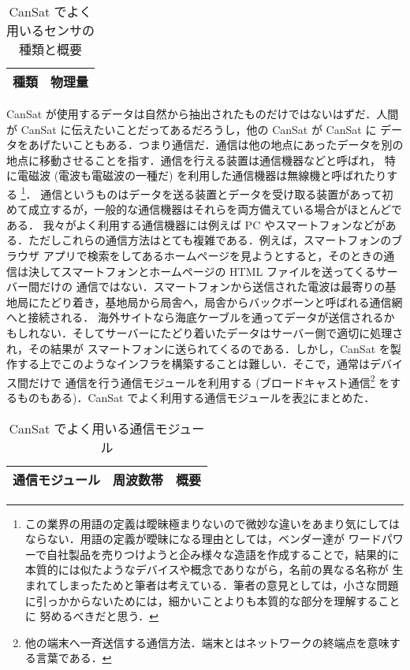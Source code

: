 \documentclass[dvipdfmx]{jsbook}
\begin{document}
  \begin{table}[htbp]
    \centering
    \caption{CanSat でよく用いるセンサの種類と概要}
    \begin{tabular}{c|r} \hline
      種類 & 物理量 \\ \hline
    \end{tabular}
    \label{tab:2.2.2-sensors}
  \end{table}

  CanSat が使用するデータは自然から抽出されたものだけではないはずだ．人間が CanSat に伝えたいことだってあるだろうし，他の CanSat が CanSat に
  データをあげたいこともある．つまり通信だ．通信は他の地点にあったデータを別の地点に移動させることを指す．通信を行える装置は通信機器などと呼ばれ，
  特に電磁波 (電波も電磁波の一種だ) を利用した通信機器は無線機と呼ばれたりする
  \footnote{この業界の用語の定義は曖昧極まりないので微妙な違いをあまり気にしてはならない．用語の定義が曖昧になる理由としては，ベンダー達が
  ワードパワーで自社製品を売りつけようと企み様々な造語を作成することで，結果的に本質的には似たようなデバイスや概念でありながら，名前の異なる名称が
  生まれてしまったためと筆者は考えている．筆者の意見としては，小さな問題に引っかからないためには，細かいことよりも本質的な部分を理解することに
  努めるべきだと思う．}．
  通信というものはデータを送る装置とデータを受け取る装置があって初めて成立するが，一般的な通信機器はそれらを両方備えている場合がほとんどである．
  我々がよく利用する通信機器には例えば PC やスマートフォンなどがある．ただしこれらの通信方法はとても複雑である．例えば，スマートフォンのブラウザ
  アプリで検索をしてあるホームページを見ようとすると，そのときの通信は決してスマートフォンとホームページの HTML ファイルを送ってくるサーバー間だけの
  通信ではない．スマートフォンから送信された電波は最寄りの基地局にたどり着き，基地局から局舎へ，局舎からバックボーンと呼ばれる通信網へと接続される．
  海外サイトなら海底ケーブルを通ってデータが送信されるかもしれない．そしてサーバーにたどり着いたデータはサーバー側で適切に処理され，その結果が
  スマートフォンに送られてくるのである．しかし，CanSat を製作する上でこのようなインフラを構築することは難しい．そこで，通常はデバイス間だけで
  通信を行う通信モジュールを利用する (ブロードキャスト通信\footnote{他の端末へ一斉送信する通信方法．端末とはネットワークの終端点を意味する言葉である．}
  をするものもある)．CanSat でよく利用する通信モジュールを表\ref{tab:2.2.2-communication-modules}にまとめた．

  \begin{table}[htbp]
    \centering
    \caption{CanSat でよく用いる通信モジュール}
    \begin{tabular}{c|c|r} \hline
      通信モジュール & 周波数帯 & 概要 \\ \hline
    \end{tabular}
    \label{tab:2.2.2-communication-modules}
  \end{table}
\end{document}
